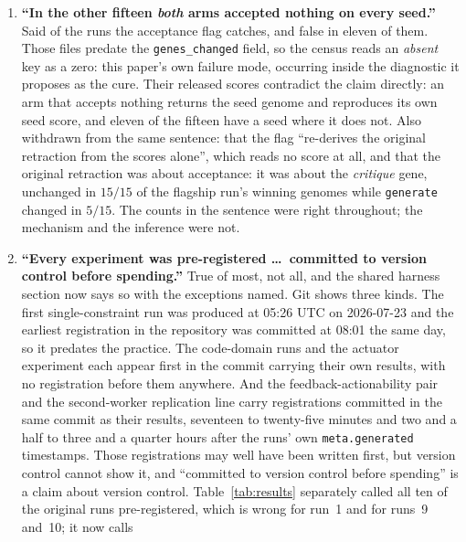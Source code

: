 \documentclass[11pt]{article}
\begin{document}
\begin{enumerate}
    correct denominator \emph{of the two available} for a between-run curve, which is what this
    section establishes. But that paper has since measured each row's own $\sigma$ and superseded
    those ratios, so ``stand'' overstated a choice between two borrowed denominators as a final
    answer.
  \item \textbf{``In the other fifteen \emph{both} arms accepted nothing on every seed.''} Said of
    the runs the acceptance flag catches, and false in eleven of them. Those files predate the
    \texttt{genes\_changed} field, so the census reads an \emph{absent} key as a zero: this
    paper's own failure mode, occurring inside the diagnostic it proposes as the cure. Their released
    scores contradict the claim directly: an arm that accepts nothing returns the seed genome and
    reproduces its own seed score, and eleven of the fifteen have a seed where it does not. Also
    withdrawn from the same sentence: that the flag ``re-derives the original retraction from the
    scores alone'', which reads no score at all, and that the original retraction was about
    acceptance: it was about the \emph{critique} gene, unchanged in $15/15$ of the flagship run's
    winning genomes while \texttt{generate} changed in $5/15$. The counts in the sentence were right throughout; the
    mechanism and the inference were not.
  \item \textbf{``Every experiment was pre-registered \ldots\ committed to version control
    before spending.''} True of most, not all, and the shared harness section now says so with the
    exceptions named. Git shows three kinds. The first single-constraint run was produced at
    05:26 UTC on 2026-07-23 and the earliest registration in the repository was committed at
    08:01 the same day, so it predates the practice. The code-domain runs and the actuator
    experiment each appear first in the commit carrying their own results, with no registration
    before them anywhere. And the feedback-actionability pair and the second-worker replication
    line carry registrations committed in the same commit as their results, seventeen to
    twenty-five minutes and two and a half to three and a quarter hours after the runs' own
    \texttt{meta.generated} timestamps. Those registrations may well have been written first, but
    version control cannot show it, and ``committed to version control before spending'' is a
    claim about version control. Table~\ref{tab:results} separately called all ten of the
    original runs pre-registered, which is wrong for run~1 and for runs~9 and~10; it now calls

\end{enumerate}
\end{document}
